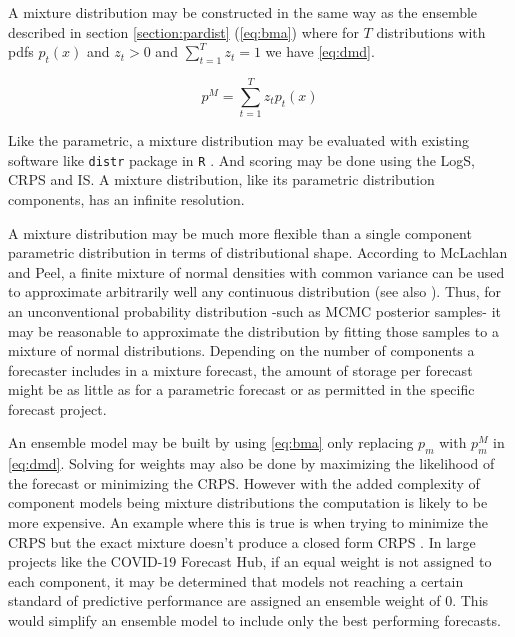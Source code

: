 \documentclass[11pt,notitlepage]{isuthesis}
\begin{document}
A mixture distribution may be constructed in the same way as the
ensemble described in section \ref{section:pardist} 
(\ref{eq:bma}) 
where for $T$ distributions
with pdfs $p_t(x)$ and $z_t > 0$ and $\sum_{t=1}^{T} z_t = 1$ we have 
\eqref{eq:dmd}.
 

\begin{equation}
\label{eq:dmd}
  p^{M} = \sum_{t=1}^T z_tp_t(x)
\end{equation}




Like the parametric, a mixture distribution may be evaluated with
existing software like \texttt{distr} package in \texttt{R} 
\cite{camphausen2007distr}. 
And 
scoring may be done  
using the LogS, CRPS and IS. A mixture distribution, like its parametric 
distribution components, has an infinite resolution.

A mixture distribution may be much more flexible than a single component 
parametric distribution in 
terms of distributional shape. According to 
McLachlan and Peel, a finite mixture of 
normal densities with common variance can be used to approximate arbitrarily 
well
any continuous distribution \cite{peel2000finite} (see also 
\cite{nguyen2019approximations}). Thus, for an unconventional probability
distribution -such as MCMC posterior samples- it may be reasonable to 
approximate the distribution by fitting those samples to a mixture of normal
distributions.
Depending on the number of components a forecaster includes in a mixture 
forecast, the amount of storage per forecast might be as little as for a 
parametric forecast or as permitted in the specific forecast project. 

An ensemble model may be built by using \eqref{eq:bma} only replacing $p_m$
with $p_m^M$ in \eqref{eq:dmd}. Solving for weights may also be done by 
maximizing
the likelihood of the forecast or minimizing the CRPS. However with the 
added complexity of component models being mixture distributions the 
computation is likely to be more expensive. An example where this is
true is when trying to minimize the CRPS but the exact mixture doesn't 
produce a closed form CRPS \cite{baran2018combining}. In large projects like
the COVID-19 Forecast Hub, if an equal weight is not assigned to each component,
it may be determined that models not reaching a certain standard of predictive
performance are
assigned an ensemble weight of 0. This would simplify an ensemble model to 
include only the best performing forecasts.
\end{document}

